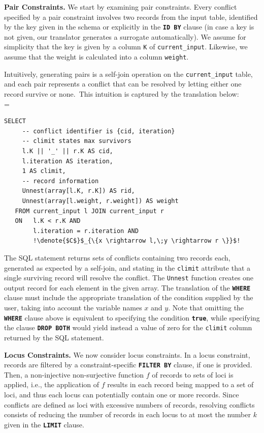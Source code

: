 \documentclass[11pt, oneside]{report}
\newcommand{\minisec}[1]{\noindent\textbf{#1.}}
\newcommand{\denote}[1]{\text{$[\![ $#1$ ]\!]$}}
\begin{document}
\minisec{Pair Constraints}
We start by examining pair constraints. Every conflict specified by a pair constraint involves two records from the input table, identified by the key given in the schema or explicitly in the \textbf{\texttt{ID BY}} clause (in case a key is not given, our translator generates a surrogate automatically). We assume for simplicity that the key is given by a column \texttt{K} of \texttt{current\_input}. Likewise, we assume that the weight is calculated into a column \texttt{weight}.  

Intuitively, generating pairs is a self-join operation on the \texttt{current\_input} table, and each pair represents a conflict that can be resolved by letting either one record survive or none.~This intuition is captured by the translation below: \\

\denote{\lstinline!FOREACH PAIR!$\;x,\;y\;$\lstinline!WHERE!$\;C\;$\lstinline!DROP ONE!} =
\begin{lstlisting}[mathescape,escapechar=!]
   SELECT
     -- conflict identifier is {cid, iteration}
     -- climit states max survivors
     l.K || '_' || r.K AS cid,
     l.iteration AS iteration,
     1 AS climit,
     -- record information
     Unnest(array[l.K, r.K]) AS rid,
     Unnest(array[l.weight, r.weight]) AS weight
   FROM current_input l JOIN current_input r
   ON   l.K < r.K AND
        l.iteration = r.iteration AND
        !\denote{$C$}$_{\{x \rightarrow l,\;y \rightarrow r \}}$!
\end{lstlisting}

The SQL statement returns sets of conflicts containing two records each, generated as expected by a self-join, and stating in the \texttt{climit} attribute that a single surviving record will resolve the conflict. The \texttt{Unnest} function creates one output record for each element in the given array. The translation of the \textbf{\texttt{WHERE}} clause must include the appropriate translation of the condition supplied by the user, taking into account the variable names $x$ and $y$. Note that omitting the \textbf{\texttt{WHERE}} clause above is equivalent to specifying the condition \textbf{\texttt{true}}, while specifying the clause \textbf{\texttt{DROP BOTH}} would yield instead a value of zero for the \texttt{climit} column returned by the SQL statement.
 
\minisec{Locus Constraints}
We now consider locus constraints. In a locus constraint, records are filtered by a constraint-specific \textbf{\texttt{FILTER BY}} clause, if one is provided. Then, a non-injective non-surjective function $f$ of records to sets of loci is applied, i.e., the application of $f$ results in each record being mapped to a set of loci, and thus each locus can potentially contain one or more records. Since conflicts are defined as loci with excessive numbers of records, resolving conflicts consists of reducing the number of records in each locus to at most the number $k$ given in the \textbf{\texttt{LIMIT}} clause. \\
\end{document}

